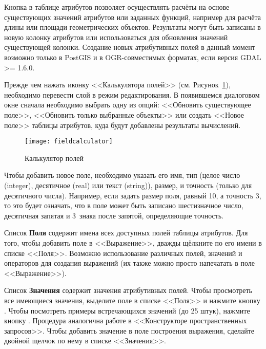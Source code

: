 Кнопка  в
таблице атрибутов позволяет осуществлять расчёты на основе существующих
значений атрибутов или заданных функций, например для расчёта длины или
площади геометрических объектов. Результаты могут быть записаны в новую
колонку атрибутов или использоваться для обновления значений существующей
колонки. Создание новых атрибутивных полей в данный момент возможно только
в PostGIS и в OGR-совместимых форматах, если версия GDAL >= 1.6.0.

Прежде чем нажать иконку <<Калькулятора полей>> (см. Рисунок~\ref{fig:field_calculator}),
необходимо перевести слой в режим редактирования. В появившемся диалоговом
окне сначала необходимо выбрать одну из опций: <<Обновить существующее поле>>,
<<Обновить только выбранные объекты>> или создать <<Новое поле>> таблицы
атрибутов, куда будут добавлены результаты вычислений.

\begin{figure}[ht]
  \centering
    \texttt{[image: fieldcalculator]}
    \caption{Калькулятор полей \wincaption}\label{fig:field_calculator}
\end{figure}

Чтобы добавить новое поле, необходимо указать его имя, тип (целое число
(integer), десятичное (real) или текст (string)), размер, и точность
(только для десятичного числа). Например, если задать размер поля, равный
10, а точность 3, то это будет означать, что в поле может быть записано
шестизначное число, десятичная запятая и 3~знака после запятой, определяющие
точность.

Список \textbf{Поля} содержит имена всех доступных полей таблицы атрибутов.
Для того, чтобы добавить поле в <<Выражение>>, дважды щёлкните по его имени
в списке <<Поля>>. Возможно использование различных полей, значений и
операторов для создания выражений (их также можно просто напечатать в
поле <<Выражение>>).

Список \textbf{Значения} содержит значения атрибутивных полей. Чтобы
просмотреть все имеющиеся значения, выделите поле в списке <<Поля>> и
нажмите кнопку  .
Чтобы посмотреть примеры встречающихся значений (до 25 штук), нажмите
кнопку  .
Процедура аналогична работе в <<Конструкторе пространственных запросов>>.
Чтобы добавить значение в поле построения выражения, сделайте двойной
щелчок по нему в списке <<Значения>>.

